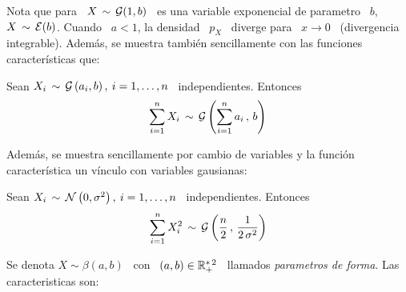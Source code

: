 Nota  que para  \  $X \,  \sim  \, \mathcal{G}(1,b)$  \ es  una  variable exponencial  de
parametro \  $b$, \ie \ $X \,  \sim \, \mathcal{E}(b)$. Cuando  \ $a < 1$,  la densidad \
$p_X$  \ diverge  para \  $x  \to 0$  \ (divergencia  integrable). Adem\'as,  se
muestra tambi\'en sencillamente con las funciones caracter\'isticas que:
%
\begin{lema}[Stabilidad]
\label{Lem:MP:StabilidadGamma}
%
  Sean $X_i  \, \sim  \, \mathcal{G}\left( a_i  , b  \right), \: i  = 1 ,  \ldots ,  n$ \
  independientes. Entonces
  \[
  \sum_{i=1}^n X_i \, \sim \, \mathcal{G}\left( \sum_{i=1}^n a_i \, , \, b \right)
  \]
\end{lema}

Adem\'as,  se muestra  sencillamente  por  cambio de  variables  y la  funci\'on
caracter\'istica un v\'inculo con variables gausianas:
%
\begin{lema}
\label{Lem:MP:VinvuloGammaGaussiana}
%
  Sean $X_i \, \sim \,  \mathcal{N}\left( 0 , \sigma^2 \right), \: i = 1  , \ldots , n$ \
  independientes. Entonces
  \[
  \sum_{i=1}^n  X_i^2 \,  \sim \,  \mathcal{G}\left( \frac{n}{2}  \, ,  \,  \frac{1}{2 \,
      \sigma^2} \right)
  \]
\end{lema}







\label{Sssec:MP:Beta}

Se denota $X  \sim \beta(a,b)$ \ con  \ $(a,b) \in \mathbb{R}_+^{* \,  2}$ \ llamados
{\em parametros de forma}.  Las caracteristicas son:

